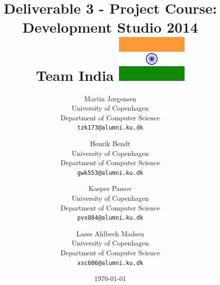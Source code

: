 \documentclass[a4paper,11pt]{article}
\title{Deliverable 3 - Project Course: Development Studio 2014 \\ Team India \includegraphics[width=.04\textwidth]{india.png}}
\author
{
    Martin J\o rgensen \\
    University of Copenhagen \\
    Department of Computer Science \\
    {\tt tzk173@alumni.ku.dk}
    \and
    Henrik Bendt \\
    University of Copenhagen \\
    Department of Computer Science \\
    {\tt gwk553@alumni.ku.dk}
    \and
    Kasper Passov \\
    University of Copenhagen \\
    Department of Computer Science \\
    {\tt pvx884@alumni.ku.dk}
    \and
    Lasse Ahlbech Madsen \\
    University of Copenhagen \\
    Department of Computer Science \\
    {\tt xsc606@alumni.ku.dk}
}
\date{\today}
\begin{document}
\maketitle

\tableofcontents
\pagebreak





\end{document}

